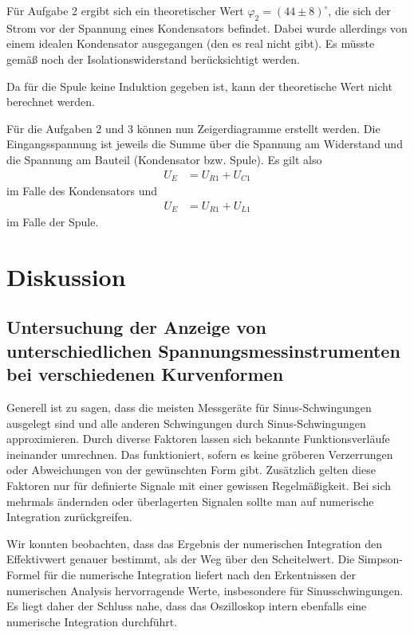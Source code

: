 \documentclass{article}
\begin{document}
Für Aufgabe 2 ergibt sich ein theoretischer Wert $\varphi_2 = (44 \pm 8)^\circ$, die sich der Strom vor der Spannung eines Kondensators befindet. Dabei wurde allerdings von einem idealen Kondensator ausgegangen (den es real nicht gibt). Es müsste gemäß \cite{moodle} noch der Isolationswiderstand berücksichtigt werden. 

Da für die Spule keine Induktion gegeben ist, kann der theoretische Wert nicht berechnet werden.



Für die Aufgaben 2 und 3 können nun Zeigerdiagramme erstellt werden. Die Eingangsspannung ist jeweils die Summe über die Spannung am Widerstand und die Spannung am Bauteil (Kondensator bzw. Spule). Es gilt also
\begin{align*}
U_E &= U_{R1} + U_{C1}
\end{align*}
im Falle des Kondensators und 
\begin{align*}
U_E &= U_{R1} + U_{L1}
\end{align*}
im Falle der Spule.



\section{Diskussion}


\subsection{Untersuchung  der  Anzeige  von  unterschiedlichen  Spannungsmessinstrumenten  bei verschiedenen Kurvenformen }


Generell ist zu sagen, dass die meisten Messgeräte für Sinus-Schwingungen ausgelegt sind und alle anderen Schwingungen durch Sinus-Schwingungen approximieren. Durch diverse Faktoren lassen sich bekannte Funktionsverläufe ineinander umrechnen. Das funktioniert, sofern es keine gröberen Verzerrungen oder Abweichungen von der gewünschten Form gibt. Zusätzlich gelten diese Faktoren nur für definierte Signale mit einer gewissen Regelmäßigkeit. Bei sich mehrmals ändernden oder überlagerten Signalen sollte man auf numerische Integration zurückgreifen.

Wir konnten beobachten, dass das Ergebnis der numerischen Integration den Effektivwert genauer bestimmt, als der Weg über den Scheitelwert. Die Simpson-Formel für die numerische Integration liefert nach den Erkentnissen der numerischen Analysis hervorragende Werte, insbesondere für Sinusschwingungen. Es liegt daher der Schluss nahe, dass das Oszilloskop intern ebenfalls eine numerische Integration durchführt.
\end{document}

